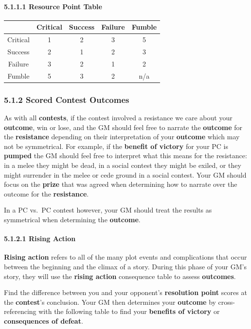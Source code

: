 \documentclass[
]{article}
\begin{document}
\hypertarget{resource-point-table}{%
\paragraph{5.1.1.1 Resource Point Table}\label{resource-point-table}}

\begin{longtable}[]{@{}ccccc@{}}
\toprule
& Critical & Success & Failure & Fumble\tabularnewline
\midrule
\endhead
Critical & 1 & 2 & 3 & 5\tabularnewline
Success & 2 & 1 & 2 & 3\tabularnewline
Failure & 3 & 2 & 1 & 2\tabularnewline
Fumble & 5 & 3 & 2 & n/a\tabularnewline
\bottomrule
\end{longtable}

\hypertarget{scored-contest-outcomes}{%
\subsubsection{5.1.2 Scored Contest
Outcomes}\label{scored-contest-outcomes}}

As with all \textbf{contests}, if the contest involved a resistance we
care about your \textbf{outcome}, win or lose, and the GM should feel
free to narrate the \textbf{outcome} for the \textbf{resistance}
depending on their interpretation of your \textbf{outcome} which may not
be symmetrical. For example, if the \textbf{benefit of victory} for your
PC is \textbf{pumped} the GM should feel free to interpret what this
means for the resistance: in a melee they might be dead, in a social
contest they might be exiled, or they might surrender in the melee or
cede ground in a social contest. Your GM should focus on the
\textbf{prize} that was agreed when determining how to narrate over the
outcome for the \textbf{resistance}.

In a PC vs.~PC contest however, your GM should treat the results as
symmetrical when determining the \textbf{outcome}.

\hypertarget{rising-action}{%
\paragraph{5.1.2.1 Rising Action}\label{rising-action}}

\textbf{Rising action} refers to all of the many plot events and
complications that occur between the beginning and the climax of a
story. During this phase of your GM's story, they will use the
\textbf{rising action} consequence table to assess \textbf{outcomes}.

Find the difference between you and your opponent's \textbf{resolution
point} scores at the \textbf{contest}'s conclusion. Your GM then
determines your \textbf{outcome} by cross-referencing with the following
table to find your \textbf{benefits of victory} or \textbf{consequences
of defeat}.
\end{document}
